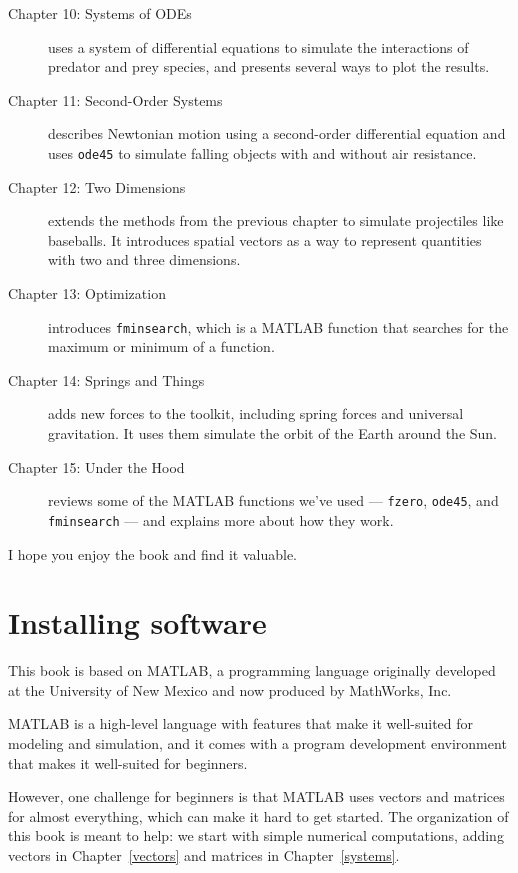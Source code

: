 \begin{description}
\item [Chapter 10: Systems of ODEs] uses a system of differential equations to simulate the interactions of predator and prey species, and presents several ways to plot the results.

\item [Chapter 11: Second-Order Systems] describes Newtonian motion using a second-order differential equation and uses {\tt ode45} to simulate falling objects with and without air resistance.

\item [Chapter 12: Two Dimensions] extends the methods from the previous chapter to simulate projectiles like baseballs.  It introduces spatial vectors as a way to represent quantities with two and three dimensions.

\item [Chapter 13: Optimization] introduces {\tt fminsearch}, which is a MATLAB function that searches for the maximum or minimum of a function.

\item [Chapter 14: Springs and Things] adds new forces to the toolkit, including spring forces and universal gravitation.  It uses them simulate the orbit of the Earth around the Sun.

\item [Chapter 15: Under the Hood] reviews some of the MATLAB functions we've used --- {\tt fzero}, {\tt ode45}, and {\tt fminsearch} --- and explains more about how they work.

\end{description}

I hope you enjoy the book and find it valuable.


\section*{Installing software}

This book is based on MATLAB, a programming language originally developed at the University of New Mexico and now produced by MathWorks, Inc.

MATLAB is a high-level language with features that make it well-suited for modeling and simulation, and it comes with a program development environment that makes it well-suited for beginners.

However, one challenge for beginners is that MATLAB uses vectors and matrices for almost everything, which can make it hard to get started.  The organization of this book is meant to help: we start with simple numerical computations, adding vectors in Chapter~\ref{vectors} and matrices in Chapter~\ref{systems}.

